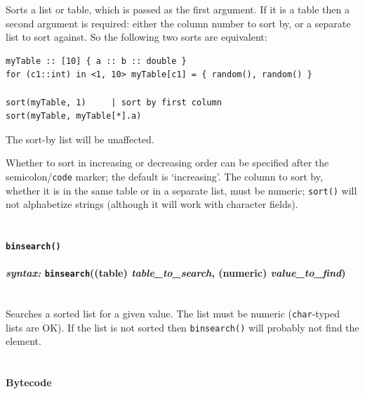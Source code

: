 \documentclass{article}
\newenvironment{code}{
       \begin{list}{}{
               \setlength{\leftmargin}{.4in}
               \setlength{\rightmargin}{0in}
               \setlength{\topsep}{.2in}
       }
       \small
       \item[] }
       { \end{list}   }
\begin{document}
Sorts a list or table, which is passed as the first argument.  If it is a table then a second argument is required: either the column number to sort by, or a separate list to sort against.  So the following two sorts are equivalent:

\begin{code} \begin{verbatim}
myTable :: [10] { a :: b :: double }
for (c1::int) in <1, 10> myTable[c1] = { random(), random() }

sort(myTable, 1)     | sort by first column
sort(myTable, myTable[*].a)
\end{verbatim} \end{code}

\noindent The sort-by list will be unaffected.

Whether to sort in increasing or decreasing order can be specified after the semicolon/\verb#code# marker; the default is `increasing'.  The column to sort by, whether it is in the same table or in a separate list, must be numeric; \verb#sort()# will not alphabetize strings (although it will work with character fields).\\\\



\paragraph{\texttt{binsearch()}\\\\
\normalfont \emph{syntax: } \texttt{binsearch}((table) \emph{table\_to\_search}, (numeric) \emph{value\_to\_find})\\\\}

Searches a sorted list for a given value.  The list must be numeric (\verb#char#-typed lists are OK).  If the list is not sorted then \verb#binsearch()# will probably not find the element.\\\\





\paragraph{Bytecode}
\end{document}
